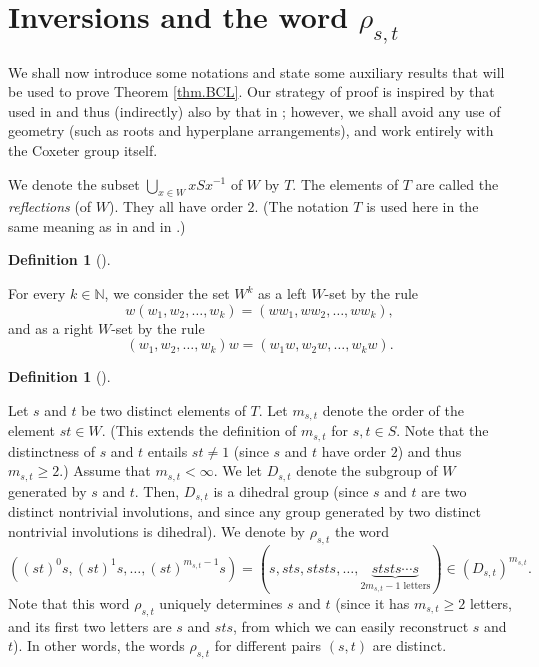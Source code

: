 \documentclass
[numbers=enddot,12pt,final,onecolumn,notitlepage,abstracton]{scrartcl}%
\theoremstyle{definition}
\newtheorem{defi}[theo]{Definition}
\newenvironment{definition}[1][]
{\begin{defi}[#1]\begin{leftbar}}
{\end{leftbar}\end{defi}}
\begin{document}
\section{Inversions and the word $\rho_{s,t}$}

We shall now introduce some notations and state some auxiliary results that
will be used to prove Theorem \ref{thm.BCL}. Our strategy of proof is inspired
by that used in \cite[\S 3.4]{BCL} and thus (indirectly) also by that in
\cite[\S 3, and proof of Corollary 5.2]{ReiRoi11}; however, we shall avoid any
use of geometry (such as roots and hyperplane arrangements), and work entirely
with the Coxeter group itself.

We denote the subset $\bigcup\limits_{x\in W}xSx^{-1}$ of $W$ by $T$. The
elements of $T$ are called the \emph{reflections} (of $W$). They all have
order $2$. (The notation $T$ is used here in the same meaning as in
\cite[\S 1]{Lusztig-Hecke} and in \cite[Chapter 4, n$^{\circ}$ 1.4]%
{Bourbaki4-6}.)

\begin{definition}
\label{def.biset}For every $k\in\mathbb{N}$, we consider the set $W^{k}$ as a
left $W$-set by the rule%
\[
w\left(  w_{1},w_{2},\ldots,w_{k}\right)  =\left(  ww_{1},ww_{2},\ldots
,ww_{k}\right)  ,
\]
and as a right $W$-set by the rule%
\[
\left(  w_{1},w_{2},\ldots,w_{k}\right)  w=\left(  w_{1}w,w_{2}w,\ldots
,w_{k}w\right)  .
\]

\end{definition}

\begin{definition}
Let $s$ and $t$ be two distinct elements of $T$. Let $m_{s,t}$ denote the
order of the element $st\in W$. (This extends the definition of $m_{s,t}$ for
$s,t\in S$. Note that the distinctness of $s$ and $t$ entails $st\neq1$ (since
$s$ and $t$ have order $2$) and thus $m_{s,t}\geq2$.) Assume that
$m_{s,t}<\infty$. We let $D_{s,t}$ denote the subgroup of $W$ generated by $s$
and $t$. Then, $D_{s,t}$ is a dihedral group (since $s$ and $t$ are two
distinct nontrivial involutions, and since any group generated by two distinct
nontrivial involutions is dihedral). We denote by $\rho_{s,t}$ the word%
\[
\left(  \left(  st\right)  ^{0}s,\left(  st\right)  ^{1}s,\ldots,\left(
st\right)  ^{m_{s,t}-1}s\right)  =\left(  s,sts,ststs,\ldots
,\underbrace{ststs\cdots s}_{2m_{s,t}-1\text{ letters}}\right)  \in\left(
D_{s,t}\right)  ^{m_{s,t}}.
\]
Note that this word $\rho_{s,t}$ uniquely determines $s$ and $t$ (since it has
$m_{s,t}\geq2$ letters, and its first two letters are $s$ and $sts$, from
which we can easily reconstruct $s$ and $t$). In other words, the words
$\rho_{s,t}$ for different pairs $\left(  s,t\right)  $ are distinct.
\end{definition}
\end{document}
